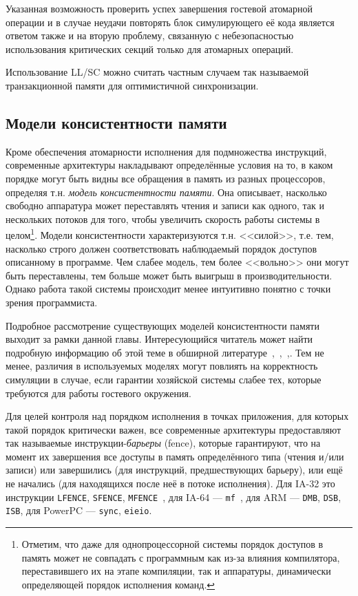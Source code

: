 Указанная возможность проверить успех завершения гостевой атомарной операции и в случае неудачи повторять блок симулирующего её кода является ответом также и на вторую проблему, связанную с небезопасностью использования критических секций только для атомарных операций.

Использование LL/SC можно считать частным случаем так называемой транзакционной памяти для оптимистичной синхронизации. %

\subsection{Модели консистентности памяти}

Кроме обеспечения атомарности исполнения для подмножества инструкций, современные архитектуры накладывают определённые условия на то, в каком порядке могут быть видны все обращения в память из разных процессоров, определяя т.н. \textit{модель консистентности памяти}. Она описывает, насколько свободно аппаратура может переставлять чтения и записи как одного, так и нескольких потоков для того, чтобы увеличить скорость работы системы в целом\footnote{Отметим, что даже для однопроцессорной системы порядок доступов в память может не совпадать с программным как из-за влияния компилятора, переставившего их на этапе компиляции, так и аппаратуры, динамически определяющей порядок исполнения команд.}. Модели консистентности характеризуются т.н. <<силой>>, т.е. тем, насколько строго должен соответствовать наблюдаемый порядок доступов описанному в программе. Чем слабее модель, тем более <<вольно>> они могут быть переставлены, тем больше может быть выигрыш в производительности. Однако работа такой системы происходит менее интуитивно понятно с точки зрения программиста.

Подробное рассмотрение существующих моделей консистентности памяти выходит за рамки данной главы. Интересующийся читатель может найти подробную информацию об этой теме в обширной литературе~\cite{Adve96sharedmemory},~\cite{Mosberger93memoryconsistency},~\cite[глава 9 и приложение A.7]{DBLP:books/daglib/0013597},\cite{whymb}. Тем не менее, различия в используемых моделях могут повлиять на корректность симуляции в случае, если гарантии хозяйской системы слабее тех, которые требуются для работы гостевого окружения. 

Для целей контроля над порядком исполнения в точках приложения, для которых такой порядок критически важен, все современные архитектуры предоставляют так называемые инструкции-\textit{барьеры} (\abbr fence), которые гарантируют, что на момент их завершения все доступы в память определённого типа (чтения и/или записи) или завершились (для инструкций, предшествующих барьеру), или ещё не начались (для находящихся после неё в потоке исполнения). Для IA-32 это инструкции \texttt{LFENCE}, \texttt{SFENCE}, \texttt{MFENCE}~\cite{intel-64-memory-ordering}, для IA-64 — \texttt{mf}~\cite{itanium-mem-order}, для ARM — \texttt{DMB}, \texttt{DSB}, \texttt{ISB}, для PowerPC — \texttt{sync}, \texttt{eieio}.

